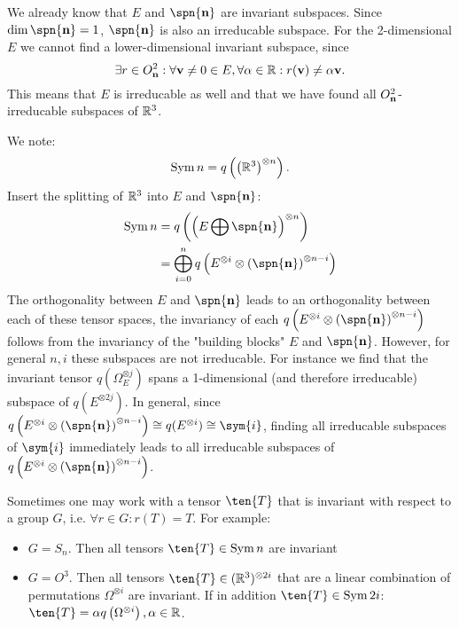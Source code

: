 {\begin{definition}
\end{definition}
\begin{example}
	We already know that $E$ and $\spn{\vc{n}}$ are invariant subspaces. Since $\dim{\spn{\vc{n}}}=1$, $\spn{\vc{n}}$ is also an irreducable subspace.
	For the 2-dimensional $E$ we cannot find a lower-dimensional invariant subspace, since \[\exists r\in O^2_{\mathbf{n}}: \forall \mathbf{v}\neq 0 \in E, \forall \alpha\in\mathbb{R}: r(\mathbf{v})\neq \alpha \mathbf{v}.\] This means that $E$ is irreducable as well and that we have found all $O^2_{\mathbf{n}}$-irreducable subspaces of $\mathbb{R}^3$.
\end{example}
\begin{example}
	We note:
	\[\operatorname{Sym}{n} = q\left(\left(\mathbb{R}^3\right)^{\otimes n}\right).\]
	Insert the splitting of $\mathbb{R}^3$ into $E$ and $\spn{\vc{n}}$:
	\begin{align*}
		\Sym{n} &= q\left(\left(E\bigoplus\spn{\vc{n}}\right)^{\otimes n}\right) \\
		&=\bigoplus_{i=0}^n q\left(E^{\otimes i}\otimes \left(\spn{\vc{n}}\right)^{\otimes n-i}\right)
	\end{align*}
	The orthogonality between $E$ and $\spn{\vc{n}}$ leads to an orthogonality between each of these tensor spaces, the invariancy of each $q\left(E^{\otimes i}\otimes \left(\spn{\vc{n}}\right)^{\otimes n-i}\right)$ follows from the invariancy of the "building blocks" $E$ and $\spn{\vc{n}}$. However, for general $n,i$ these subspaces are not irreducable. For instance we find that the invariant tensor $q(\Omega_E^{\otimes j})$ spans a 1-dimensional (and therefore irreducable) subspace  of $q(E^{\otimes 2j})$. In general, since $q\left(E^{\otimes i}\otimes \left(\spn{\vc{n}}\right)^{\otimes n-i}\right)\cong q(E^{\otimes i})\cong\sym{i}$, finding all irreducable subspaces of $\sym{i}$ immediately leads to all irreducable subspaces of $q\left(E^{\otimes i}\otimes \left(\spn{\vc{n}}\right)^{\otimes n-i}\right)$. 
\end{example}
\begin{remark}
	Sometimes one may work with a tensor $\ten{T}$ that is invariant with respect to a group $G$, i.e. $\forall r\in G: r(T) = T$. For example:
	\begin{itemize}
		\item $G=S_n$. Then all tensors $\ten{T}\in\Sym{n}$ are invariant
		\item $G=O^3$. Then all tensors $\ten{T}\in(\IR^3)^{\otimes 2i}$ that are a linear combination of permutations $\Omega^{\otimes i}$ are invariant. If in addition $\ten{T}\in\Sym{2i}$: $\ten{T}=\alpha q\left(\Omega^{\otimes i}\right), \alpha\in\IR$.

\end{itemize}
\end{remark}}
